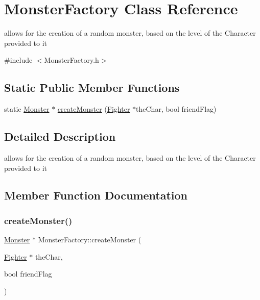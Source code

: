 \hypertarget{class_monster_factory}{}\section{Monster\+Factory Class Reference}
\label{class_monster_factory}


allows for the creation of a random monster, based on the level of the Character provided to it  




{\ttfamily \#include $<$Monster\+Factory.\+h$>$}

\subsection*{Static Public Member Functions}
\begin{DoxyCompactItemize}
\item 
static \hyperlink{class_monster}{Monster} $\ast$ \hyperlink{class_monster_factory_a6313087b1702d07efc97777a75cc0e32}{create\+Monster} (\hyperlink{class_fighter}{Fighter} $\ast$the\+Char, bool friend\+Flag)
\end{DoxyCompactItemize}


\subsection{Detailed Description}
allows for the creation of a random monster, based on the level of the Character provided to it 

\subsection{Member Function Documentation}
\hypertarget{class_monster_factory_a6313087b1702d07efc97777a75cc0e32}{}\label{class_monster_factory_a6313087b1702d07efc97777a75cc0e32} 
\subsubsection{\texorpdfstring{create\+Monster()}{createMonster()}}
{\footnotesize\ttfamily \hyperlink{class_monster}{Monster} $\ast$ Monster\+Factory\+::create\+Monster (\begin{DoxyParamCaption}\item[{\hyperlink{class_fighter}{Fighter} $\ast$}]{the\+Char,  }\item[{bool}]{friend\+Flag }\end{DoxyParamCaption})\hspace{0.3cm}{\ttfamily [static]}}

